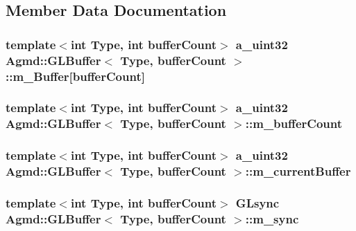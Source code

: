 \subsection{Member Data Documentation}
\hypertarget{class_agmd_1_1_g_l_buffer_a281b02c645aa1ff45ed8efa1b39b63a0}{
\subsubsection[{m\+\_\+\+Buffer}]{\setlength{\rightskip}{0pt plus 5cm}template$<$int Type, int buffer\+Count$>$ {\bf a\+\_\+uint32} {\bf Agmd\+::\+G\+L\+Buffer}$<$ Type, buffer\+Count $>$\+::m\+\_\+\+Buffer\mbox{[}buffer\+Count\mbox{]}\hspace{0.3cm}{\ttfamily [protected]}}}\label{class_agmd_1_1_g_l_buffer_a281b02c645aa1ff45ed8efa1b39b63a0}
\hypertarget{class_agmd_1_1_g_l_buffer_ab4d48ed43d7d9dc07952a89cdca3f87e}{
\subsubsection[{m\+\_\+buffer\+Count}]{\setlength{\rightskip}{0pt plus 5cm}template$<$int Type, int buffer\+Count$>$ {\bf a\+\_\+uint32} {\bf Agmd\+::\+G\+L\+Buffer}$<$ Type, buffer\+Count $>$\+::m\+\_\+buffer\+Count\hspace{0.3cm}{\ttfamily [protected]}}}\label{class_agmd_1_1_g_l_buffer_ab4d48ed43d7d9dc07952a89cdca3f87e}
\hypertarget{class_agmd_1_1_g_l_buffer_a6b438c680953a18ac2ae19a7913f596f}{
\subsubsection[{m\+\_\+current\+Buffer}]{\setlength{\rightskip}{0pt plus 5cm}template$<$int Type, int buffer\+Count$>$ {\bf a\+\_\+uint32} {\bf Agmd\+::\+G\+L\+Buffer}$<$ Type, buffer\+Count $>$\+::m\+\_\+current\+Buffer\hspace{0.3cm}{\ttfamily [protected]}}}\label{class_agmd_1_1_g_l_buffer_a6b438c680953a18ac2ae19a7913f596f}
\hypertarget{class_agmd_1_1_g_l_buffer_a08b79b8ed0540dd4350254abe0e426bd}{
\subsubsection[{m\+\_\+sync}]{\setlength{\rightskip}{0pt plus 5cm}template$<$int Type, int buffer\+Count$>$ G\+Lsync {\bf Agmd\+::\+G\+L\+Buffer}$<$ Type, buffer\+Count $>$\+::m\+\_\+sync\hspace{0.3cm}{\ttfamily [protected]}}}\label{class_agmd_1_1_g_l_buffer_a08b79b8ed0540dd4350254abe0e426bd}


